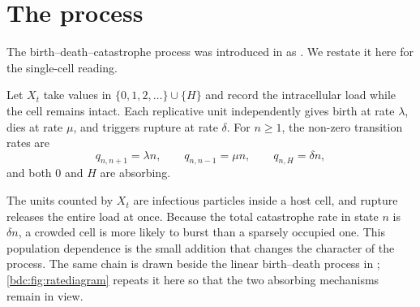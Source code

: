 \section{The process}
\label{bdc:sec:process}

The birth--death--catastrophe process was introduced in \ChM{} as
. We restate it here for the single-cell
reading.

\begin{definition}
\label{bdc:def:bdc}
Let $X_t$ take values in $\{0,1,2,\ldots\}\cup\{H\}$ and record the
intracellular load while the cell remains intact. Each replicative unit
independently gives birth at rate $\lambda$, dies at rate $\mu$, and
triggers rupture at rate $\delta$. For $n\ge1$, the non-zero transition
rates are
\begin{equation}
\label{bdc:eq:rates}
q_{n,n+1}=\lambda n,
\qquad
q_{n,n-1}=\mu n,
\qquad
q_{n,H}=\delta n,
\end{equation}
and both $0$ and $H$ are absorbing.
\end{definition}

The units counted by $X_t$ are infectious particles inside a host cell, and
rupture releases the entire load at once. Because the total catastrophe rate
in state $n$ is $\delta n$, a crowded cell is more likely to burst than a
sparsely occupied one. This population dependence is the small addition that
changes the character of the process. The same chain is drawn beside the
linear birth--death process in ; \cref{bdc:fig:ratediagram} repeats it here so that the two absorbing
mechanisms remain in view.

